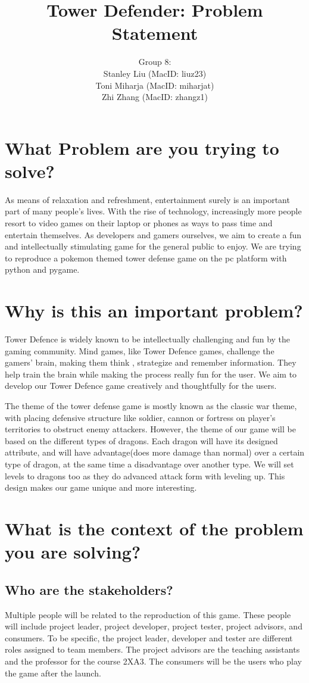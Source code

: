 \documentclass[12pt]{article}
\title{Tower Defender: Problem Statement}
\author{Group 8: \\
                 Stanley Liu (MacID: liuz23) \\    
                 Toni Miharja (MacID: miharjat)\\
                 Zhi Zhang (MacID: zhangz1)}
\begin{document}
\maketitle

\section {What Problem are you trying to solve?}
As means of relaxation and refreshment, entertainment surely is an important part of many people’s lives. With the rise of technology, increasingly more people resort to video games on their laptop or phones as ways to pass time and entertain themselves. As developers and gamers ourselves, we aim to create a fun and intellectually stimulating game for the general public to enjoy. We are trying to reproduce a pokemon themed tower defense game on the pc platform with python and pygame.

\section {Why is this an important problem?}
Tower Defence is widely known to be intellectually challenging and fun by the gaming community. Mind games, like Tower Defence games, challenge the gamers’ brain, making them think , strategize and remember information. They help train the brain while making the process really fun for the user. We aim to develop  our Tower Defence game creatively and thoughtfully for the users.

The theme of the tower defense game is mostly known as the classic war theme, with placing defensive structure like soldier, cannon or fortress on player’s territories to obstruct enemy attackers. However, the theme of our game will be based on the different types of dragons. Each dragon will have its designed attribute, and will have advantage(does more damage than normal) over a certain type of dragon, at the same time a disadvantage over another type. We will set levels to dragons too as they do advanced attack form with leveling up. This design makes our game unique and more interesting.
\section {What is the context of the problem you are solving?}
    \subsection {Who are the stakeholders?}
    Multiple people will be related to the reproduction of this game. These people will include project leader, project developer, project tester, project advisors, and consumers. To be specific, the project leader, developer and tester are different roles assigned to team members. The project advisors are the teaching assistants and the professor for the course 2XA3. The consumers will be the users who play the game after the launch.
\end{document}
